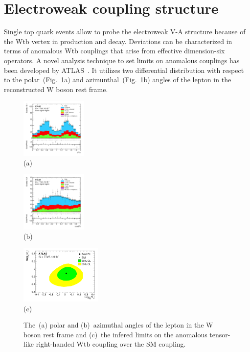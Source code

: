 \documentclass{PoS}
\begin{document}
\section{Electroweak coupling structure}
Single top quark events allow to probe the electroweak V-A structure because of the Wtb vertex in production and decay. Deviations can be characterized in terms of anomalous Wtb couplings that arise from effective dimension-six operators. A novel analysis technique to set limits on anomalous couplings has been developed by ATLAS~\cite{atlas-anomcoupl}. It utilizes two differential distribution with respect to the polar~(Fig.~\ref{fig:angles}a) and azimunthal~(Fig.~\ref{fig:angles}b) angles of the lepton in the reconstructed W boson rest frame.

\begin{figure}[htbp]
\begin{center}
\parbox[t]{0.3\textwidth}{\centering\includegraphics[width=0.29\textwidth]{atlas_anomcoupl/phi.pdf}\\(a)}
\parbox[t]{0.3\textwidth}{\centering\includegraphics[width=0.29\textwidth]{atlas_anomcoupl/theta.pdf}\\(b)}
\parbox[t]{0.38\textwidth}{\centering\includegraphics[width=0.36\textwidth]{atlas_anomcoupl/limits.pdf}\\(c)}
\end{center}
\caption{\label{fig:angles}The~(a) polar and (b)~azimuthal angles of the lepton in the W boson rest frame and (c)~the infered limits on the anomalous tensor-like right-handed Wtb coupling over the SM coupling.}
\end{figure}
\end{document}
